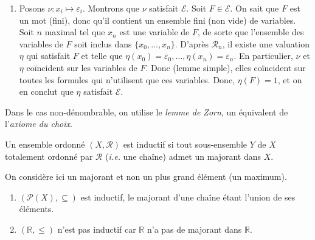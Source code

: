 \documentclass[./main]{subfiles}
\begin{document}
\begin{prv}
\begin{enumerate}
\begin{itemize}
\begin{itemize}
                Montrons la propriété $\mathcal{R}_{n+1}$.
                Considérons une partie finie $B$ de $\mathcal{E}$.
                D'après $\mathcal{R}_n$, il existe une valuation $\eta$ qui satisfait $A \cup B$, sous-ensemble fini de $\mathcal{E}$, et qui vérifie $\forall i \in \llbracket 1,n\rrbracket$, $\eta(x_i) = \varepsilon_i$.
                En particulier $\eta$ satisfait $A$, ce qui implique par $(\star)$, que $\eta(x_{n+1}) = 1 = \varepsilon_{n+1}$.
                Et comme $\eta$ satisfait $B$, on obtient bien $\mathcal{R}_{n+1}$.
            \end{itemize}
        \end{itemize}

      \item Posons $\nu : x_i \mapsto \varepsilon_i$.
        Montrons que $\nu$ satisfait $\mathcal{E}$.
        Soit $F \in \mathcal{E}$.
        On sait que $F$ est un mot (fini), donc qu'il contient un ensemble fini (non vide) de variables.
        Soit $n$ maximal tel que $x_n$ est une variable de $F$, de sorte que l'ensemble des variables de $F$ soit inclus dans $\{x_0, \ldots, x_n\}$.
        D'après $\mathcal{R}_n$, il existe une valuation $\eta$ qui satisfait $F$ et telle que $\eta(x_0) = \varepsilon_0, \ldots, \eta(x_n) = \varepsilon_n$.
        En particulier, $\nu$ et $\eta$ coïncident sur les variables de $F$.
        Donc (lemme simple), elles coïncident sur toutes les formules qui n'utilisent que ces variables.
        Donc, $\eta(F) = 1$, et on en conclut que $\eta$ satisfait $\mathcal{E}$.
    \end{enumerate}
  \end{prv}

  Dans le cas non-dénombrable, on utilise le \textit{lemme de Zorn}, un équivalent de l'\textit{axiome du choix}.

  \begin{defn}
    Un ensemble ordonné $(X, \mathcal{R})$ est inductif si tout sous-ensemble $Y$ de $X$ totalement ordonné par $\mathcal{R}$ (\textit{i.e.} une chaîne) admet un majorant dans $X$.
  \end{defn}

  \begin{rmk}
    On considère ici un majorant et non un plus grand élément (un maximum).
  \end{rmk}

  \begin{exm}
    \begin{enumerate}
      \item $(\mathcal{P}(X), \subseteq )$ est inductif, le majorant d'une chaîne étant l'union de ses éléments.
      \item $(\mathds{R}, \le)$ n'est pas inductif car $\mathds{R}$ n'a pas de majorant dans $\mathds{R}$.
    \end{enumerate}
  \end{exm}
\end{document}
